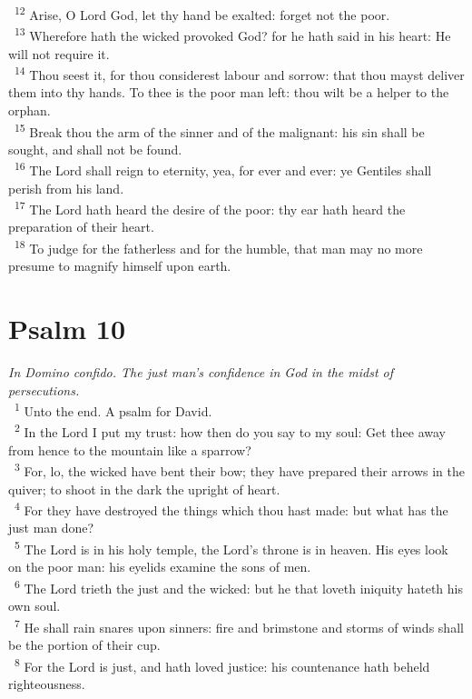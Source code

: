 \documentclass[a5paper,12pt]{article}
\begin{document}
\begin{multicols*}{2}
~\textsuperscript{12} Arise, O Lord God, let thy hand be exalted: forget not the poor.\\
~\textsuperscript{13} Wherefore hath the wicked provoked God? for he hath said in his heart: He will not require it.\\
~\textsuperscript{14} Thou seest it, for thou considerest labour and sorrow: that thou mayst deliver them into thy hands. To thee is the poor man left: thou wilt be a helper to the orphan.\\
~\textsuperscript{15} Break thou the arm of the sinner and of the malignant: his sin shall be sought, and shall not be found.\\
~\textsuperscript{16} The Lord shall reign to eternity, yea, for ever and ever: ye Gentiles shall perish from his land.\\
~\textsuperscript{17} The Lord hath heard the desire of the poor: thy ear hath heard the preparation of their heart.\\
~\textsuperscript{18} To judge for the fatherless and for the humble, that man may no more presume to magnify himself upon earth.\\

\section{Psalm 10}
\label{sec:org3b98adb}
\emph{In Domino confido. The just man's confidence in God in the midst of persecutions.}\\

~\textsuperscript{1} Unto the end. A psalm for David.\\
~\textsuperscript{2} In the Lord I put my trust: how then do you say to my soul: Get thee away from hence to the mountain like a sparrow?\\
~\textsuperscript{3} For, lo, the wicked have bent their bow; they have prepared their arrows in the quiver; to shoot in the dark the upright of heart.\\
~\textsuperscript{4} For they have destroyed the things which thou hast made: but what has the just man done?\\
~\textsuperscript{5} The Lord is in his holy temple, the Lord's throne is in heaven. His eyes look on the poor man: his eyelids examine the sons of men.\\
~\textsuperscript{6} The Lord trieth the just and the wicked: but he that loveth iniquity hateth his own soul.\\
~\textsuperscript{7} He shall rain snares upon sinners: fire and brimstone and storms of winds shall be the portion of their cup.\\
~\textsuperscript{8} For the Lord is just, and hath loved justice: his countenance hath beheld righteousness.\\


\end{multicols*}
\end{document}
